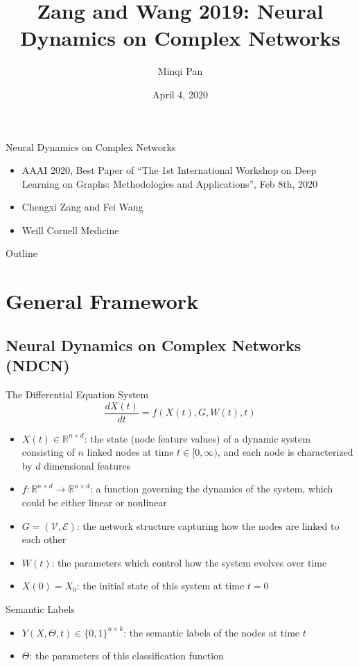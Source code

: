 \documentclass{beamer}
\title{Zang and Wang 2019: Neural Dynamics on Complex Networks}
\author{Minqi Pan}
\date{April 4, 2020}
\begin{document}
\begin{frame}
  \titlepage
\end{frame}

\begin{frame}{Neural Dynamics on Complex Networks}
\begin{itemize}
\item AAAI 2020, Best Paper of ``The 1st International Workshop on Deep Learning on Graphs: Methodologies and Applications'', Feb 8th, 2020
\item Chengxi Zang and Fei Wang
\item Weill Cornell Medicine
\end{itemize}
\end{frame}

\begin{frame}{Outline}
  \tableofcontents
\end{frame}

\section{General Framework}
\subsection{Neural Dynamics on Complex Networks (NDCN)}
\begin{frame}{The Differential Equation System}
\[
\frac{dX(t)}{dt}=f(X(t),G,W(t),t)
\]
\begin{itemize}
\item $X(t)\in\mathbb{R}^{n\times d}$: the state (node feature values) of a dynamic system consisting of $n$ linked nodes at time $t\in[0,\infty)$, and each node is characterized by $d$ dimensional features
\item $f:\mathbb{R}^{n\times d}\to\mathbb{R}^{n\times d}$: a function governing the dynamics of the system, which could be either linear or nonlinear
\item $G=(\mathcal{V},\mathcal{E})$: the network structure capturing how the nodes are linked to each other
\item $W(t)$: the parameters which control how the system evolves over time
\item $X(0)=X_0$: the initial state of this system at time $t=0$
\end{itemize}
\end{frame}

\begin{frame}{Semantic Labels}
\begin{itemize}
\item $Y(X,\Theta,t)\in\{0,1\}^{n\times k}$: the semantic labels of the nodes at time $t$
\item $\Theta$: the parameters of this classification function
\end{itemize}
\end{frame}
\end{document}
